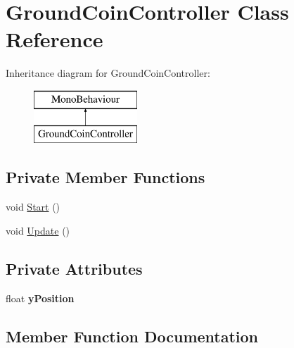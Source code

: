 \hypertarget{class_ground_coin_controller}{}\section{Ground\+Coin\+Controller Class Reference}
\label{class_ground_coin_controller}
Inheritance diagram for Ground\+Coin\+Controller\+:\begin{figure}[H]
\begin{center}
\leavevmode
\includegraphics[height=2.000000cm]{class_ground_coin_controller}
\end{center}
\end{figure}
\subsection*{Private Member Functions}
\begin{DoxyCompactItemize}
\item 
void \mbox{\hyperlink{class_ground_coin_controller_acd47d36687cefa320b73a0338d7f419a}{Start}} ()
\item 
void \mbox{\hyperlink{class_ground_coin_controller_aecea952d64783d72a80c7eeb5661cb99}{Update}} ()
\end{DoxyCompactItemize}
\subsection*{Private Attributes}
\begin{DoxyCompactItemize}
\item 
\mbox{\label{class_ground_coin_controller_a1da560bb1b40909f54df0eb741507d06}} 
float {\bfseries y\+Position}
\end{DoxyCompactItemize}


\subsection{Member Function Documentation}
\mbox{\label{class_ground_coin_controller_acd47d36687cefa320b73a0338d7f419a}} 
